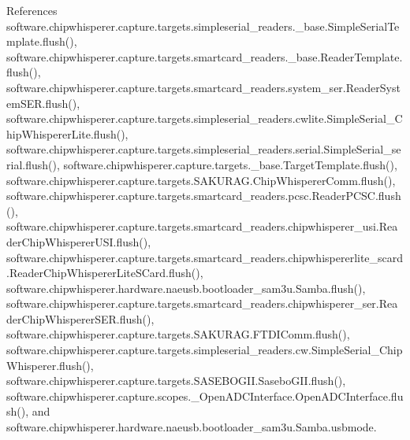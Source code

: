 References software.\+chipwhisperer.\+capture.\+targets.\+simpleserial\+\_\+readers.\+\_\+base.\+Simple\+Serial\+Template.\+flush(), software.\+chipwhisperer.\+capture.\+targets.\+smartcard\+\_\+readers.\+\_\+base.\+Reader\+Template.\+flush(), software.\+chipwhisperer.\+capture.\+targets.\+smartcard\+\_\+readers.\+system\+\_\+ser.\+Reader\+System\+S\+E\+R.\+flush(), software.\+chipwhisperer.\+capture.\+targets.\+simpleserial\+\_\+readers.\+cwlite.\+Simple\+Serial\+\_\+\+Chip\+Whisperer\+Lite.\+flush(), software.\+chipwhisperer.\+capture.\+targets.\+simpleserial\+\_\+readers.\+serial.\+Simple\+Serial\+\_\+serial.\+flush(), software.\+chipwhisperer.\+capture.\+targets.\+\_\+base.\+Target\+Template.\+flush(), software.\+chipwhisperer.\+capture.\+targets.\+S\+A\+K\+U\+R\+A\+G.\+Chip\+Whisperer\+Comm.\+flush(), software.\+chipwhisperer.\+capture.\+targets.\+smartcard\+\_\+readers.\+pcsc.\+Reader\+P\+C\+S\+C.\+flush(), software.\+chipwhisperer.\+capture.\+targets.\+smartcard\+\_\+readers.\+chipwhisperer\+\_\+usi.\+Reader\+Chip\+Whisperer\+U\+S\+I.\+flush(), software.\+chipwhisperer.\+capture.\+targets.\+smartcard\+\_\+readers.\+chipwhispererlite\+\_\+scard.\+Reader\+Chip\+Whisperer\+Lite\+S\+Card.\+flush(), software.\+chipwhisperer.\+hardware.\+naeusb.\+bootloader\+\_\+sam3u.\+Samba.\+flush(), software.\+chipwhisperer.\+capture.\+targets.\+smartcard\+\_\+readers.\+chipwhisperer\+\_\+ser.\+Reader\+Chip\+Whisperer\+S\+E\+R.\+flush(), software.\+chipwhisperer.\+capture.\+targets.\+S\+A\+K\+U\+R\+A\+G.\+F\+T\+D\+I\+Comm.\+flush(), software.\+chipwhisperer.\+capture.\+targets.\+simpleserial\+\_\+readers.\+cw.\+Simple\+Serial\+\_\+\+Chip\+Whisperer.\+flush(), software.\+chipwhisperer.\+capture.\+targets.\+S\+A\+S\+E\+B\+O\+G\+I\+I.\+Sasebo\+G\+I\+I.\+flush(), software.\+chipwhisperer.\+capture.\+scopes.\+\_\+\+Open\+A\+D\+C\+Interface.\+Open\+A\+D\+C\+Interface.\+flush(), and software.\+chipwhisperer.\+hardware.\+naeusb.\+bootloader\+\_\+sam3u.\+Samba.\+usbmode.


\hypertarget{classsoftware_1_1chipwhisperer_1_1hardware_1_1naeusb_1_1bootloader__sam3u_1_1Samba_a49f61820133ace6d29b273e1c4628e6d}{}

